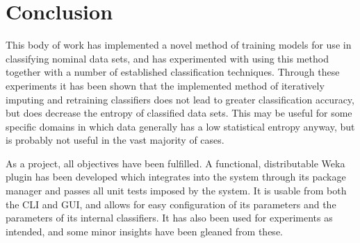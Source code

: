 \newpage
\chapter{Conclusion}\label{conclusion}
This body of work has implemented a novel method of training models for use in classifying nominal data sets, and has experimented with using this method together with a number of established classification techniques. Through these experiments it has been shown that the implemented method of iteratively imputing and retraining classifiers does not lead to greater classification accuracy, but does decrease the entropy of classified data sets. This may be useful for some specific domains in which data generally has a low statistical entropy anyway, but is probably not useful in the vast majority of cases.

As a project, all objectives have been fulfilled. A functional, distributable Weka plugin has been developed which integrates into the system through its package manager and passes all unit tests imposed by the system. It is usable from both the CLI and GUI, and allows for easy configuration of its parameters and the parameters of its internal classifiers. It has also been used for experiments as intended, and some minor insights have been gleaned from these.